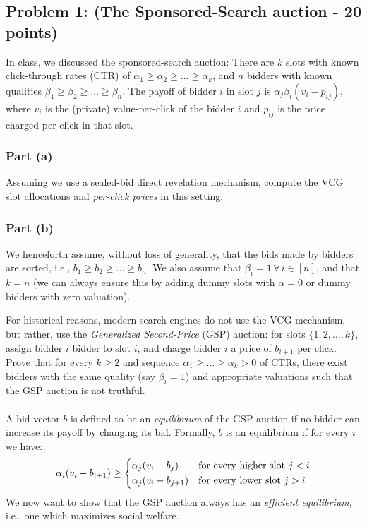 \documentclass[letterpaper,11pt]{article}
\begin{document}
\subsection*{Problem 1: (The Sponsored-Search auction - 20 points)}

In class, we discussed the sponsored-search auction: 
There are $k$ slots with known click-through rates (CTR) of $\alpha_1\geq\alpha_2\geq\ldots\geq\alpha_k$, and $n$ bidders with known qualities $\beta_1\geq\beta_2\geq\ldots\geq\beta_n$.
The payoff of bidder $i$ in slot $j$ is $\alpha_j\beta_i(v_i - p_{ij})$, where $v_i$ is the (private) value-per-click of the bidder $i$ and $p_{ij}$ is the price charged per-click in that slot. 
\subsubsection*{Part (a)} 
Assuming we use a sealed-bid direct revelation mechanism, compute the VCG slot allocations and \emph{per-click prices} in this setting.



\subsubsection*{Part (b)} 
We henceforth assume, without loss of generality, that the bids made by bidders are sorted, i.e., $b_1 \geq b_2 \geq \ldots \geq b_n$. We also assume that $\beta_i=1\,\forall\,i\in[n]$, and that $k = n$ (we can always ensure this by adding dummy slots with $\alpha=0$ or dummy bidders with zero valuation). 

For historical reasons, modern search engines do not use the VCG mechanism, but rather, use the \emph{Generalized Second-Price} (GSP) auction: for slots $\{1,2,\ldots,k\}$, assign bidder $i$ bidder to slot $i$, and charge bidder $i$ a price of $b_{i+1}$ per click. Prove that for every $k\geq 2$ and sequence $\alpha_1 \geq \ldots \geq \alpha_k > 0$ of CTRs, there exist bidders with the same quality (say $\beta_i=1$) and appropriate valuations such that the GSP auction is not truthful.\\ \\


A bid vector $b$ is defined to be an \emph{equilibrium} of the GSP auction if no bidder can increase its payoff by changing its bid. 
Formally, $b$ is an equilibrium if for every $i$ we have:
\begin{align*}
\alpha_i(v_i - b_{i+1}) \geq 
\begin{dcases*}
\alpha_j (v_i - b_j) & for every higher slot $j < i$\\
\alpha_j (v_i - b_{j+1}) & for every lower slot $j>i$
\end{dcases*}
\end{align*}
We now want to show that the GSP auction always has an \emph{efficient equilibrium}, i.e., one which maximizes social welfare.
\end{document}
